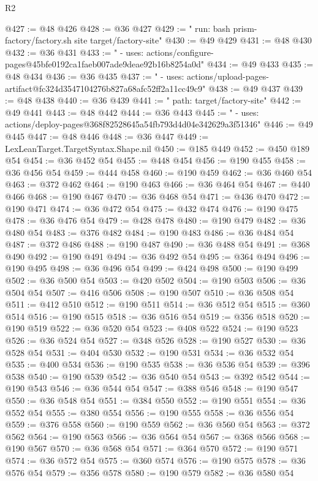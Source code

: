 \begin{lexlean}{R2}
\begin{coremodule}
@427 := @48 @426
@428 := @36 @427
@429 := "        run: bash prism-factory/factory.sh site target/factory-site"
@430 := @49 @429
@431 := @48 @430
@432 := @36 @431
@433 := "      - uses: actions/configure-pages@45bfe0192ca1faeb007ade9deae92b16b8254a0d"
@434 := @49 @433
@435 := @48 @434
@436 := @36 @435
@437 := "      - uses: actions/upload-pages-artifact@fc324d3547104276b827a68afc52ff2a11cc49c9"
@438 := @49 @437
@439 := @48 @438
@440 := @36 @439
@441 := "          path: target/factory-site"
@442 := @49 @441
@443 := @48 @442
@444 := @36 @443
@445 := "      - uses: actions/deploy-pages@368f82528645a54fb793d4d04e342629a3f51346"
@446 := @49 @445
@447 := @48 @446
@448 := @36 @447
@449 := LexLeanTarget.TargetSyntax.Shape.nil
@450 := @185 @449
@452 := @450 @189 @54
@454 := @36 @452 @54
@455 := @448 @454
@456 := @190 @455
@458 := @36 @456 @54
@459 := @444 @458
@460 := @190 @459
@462 := @36 @460 @54
@463 := @372 @462
@464 := @190 @463
@466 := @36 @464 @54
@467 := @440 @466
@468 := @190 @467
@470 := @36 @468 @54
@471 := @436 @470
@472 := @190 @471
@474 := @36 @472 @54
@475 := @432 @474
@476 := @190 @475
@478 := @36 @476 @54
@479 := @428 @478
@480 := @190 @479
@482 := @36 @480 @54
@483 := @376 @482
@484 := @190 @483
@486 := @36 @484 @54
@487 := @372 @486
@488 := @190 @487
@490 := @36 @488 @54
@491 := @368 @490
@492 := @190 @491
@494 := @36 @492 @54
@495 := @364 @494
@496 := @190 @495
@498 := @36 @496 @54
@499 := @424 @498
@500 := @190 @499
@502 := @36 @500 @54
@503 := @420 @502
@504 := @190 @503
@506 := @36 @504 @54
@507 := @416 @506
@508 := @190 @507
@510 := @36 @508 @54
@511 := @412 @510
@512 := @190 @511
@514 := @36 @512 @54
@515 := @360 @514
@516 := @190 @515
@518 := @36 @516 @54
@519 := @356 @518
@520 := @190 @519
@522 := @36 @520 @54
@523 := @408 @522
@524 := @190 @523
@526 := @36 @524 @54
@527 := @348 @526
@528 := @190 @527
@530 := @36 @528 @54
@531 := @404 @530
@532 := @190 @531
@534 := @36 @532 @54
@535 := @400 @534
@536 := @190 @535
@538 := @36 @536 @54
@539 := @396 @538
@540 := @190 @539
@542 := @36 @540 @54
@543 := @392 @542
@544 := @190 @543
@546 := @36 @544 @54
@547 := @388 @546
@548 := @190 @547
@550 := @36 @548 @54
@551 := @384 @550
@552 := @190 @551
@554 := @36 @552 @54
@555 := @380 @554
@556 := @190 @555
@558 := @36 @556 @54
@559 := @376 @558
@560 := @190 @559
@562 := @36 @560 @54
@563 := @372 @562
@564 := @190 @563
@566 := @36 @564 @54
@567 := @368 @566
@568 := @190 @567
@570 := @36 @568 @54
@571 := @364 @570
@572 := @190 @571
@574 := @36 @572 @54
@575 := @360 @574
@576 := @190 @575
@578 := @36 @576 @54
@579 := @356 @578
@580 := @190 @579
@582 := @36 @580 @54

\end{coremodule}
\end{lexlean}
